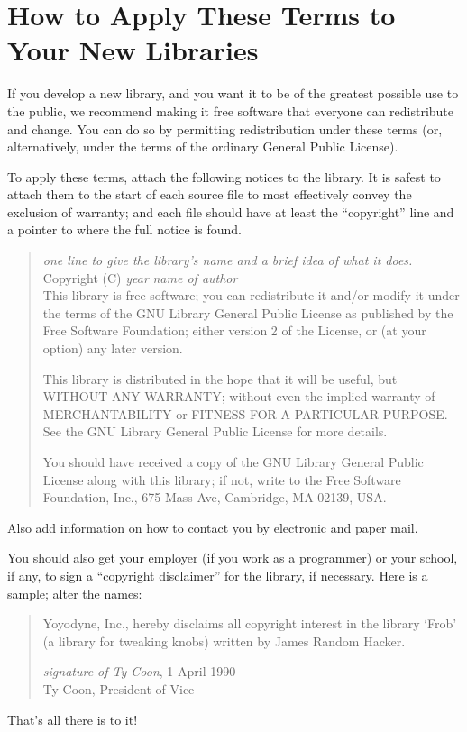 \section*{How to Apply These Terms to Your New Libraries}

  If you develop a new library, and you want it to be of the greatest
possible use to the public, we recommend making it free software that
everyone can redistribute and change.  You can do so by permitting
redistribution under these terms (or, alternatively, under the terms of the
ordinary General Public License).

  To apply these terms, attach the following notices to the library.  It is
safest to attach them to the start of each source file to most effectively
convey the exclusion of warranty; and each file should have at least the
``copyright'' line and a pointer to where the full notice is found.

\begin{quote}
{\em one line to give the library's name and a brief idea of what it does.}\\
Copyright (C) {\em year} {\em name of author}\\

    This library is free software; you can redistribute it and/or
    modify it under the terms of the GNU Library General Public
    License as published by the Free Software Foundation; either
    version 2 of the License, or (at your option) any later version.

    This library is distributed in the hope that it will be useful,
    but WITHOUT ANY WARRANTY; without even the implied warranty of
    MERCHANTABILITY or FITNESS FOR A PARTICULAR PURPOSE\@.  See the GNU
    Library General Public License for more details.

    You should have received a copy of the GNU Library General Public
    License along with this library; if not, write to the Free
    Software Foundation, Inc., 675 Mass Ave, Cambridge, MA 02139, USA.
\end{quote}

Also add information on how to contact you by electronic and paper mail.

You should also get your employer (if you work as a programmer) or your
school, if any, to sign a ``copyright disclaimer'' for the library, if
necessary.  Here is a sample; alter the names:

\begin{quote}
  Yoyodyne, Inc., hereby disclaims all copyright interest in the
  library `Frob' (a library for tweaking knobs) written by James Random Hacker.

  {\em signature of Ty Coon}, 1 April 1990\\
  Ty Coon, President of Vice
\end{quote}

That's all there is to it!
